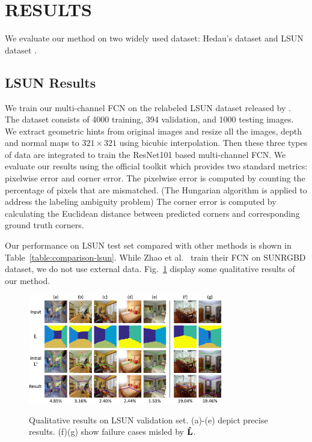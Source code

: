 \section{RESULTS}
\label{sec:Res}

We evaluate our method on two widely used dataset: Hedau's dataset \cite{hedau2009recovering} and LSUN dataset \cite{zhang2015large}. 
\subsection{LSUN Results}
\label{sec:LSUN}
We train our multi-channel FCN on the relabeled LSUN dataset released by \cite{ren2016coarse}. The dataset consists of 4000 training, 394 validation, and 1000 testing images. We extract geometric hints from original images and resize all the images, depth and normal maps to $321\times321$ using bicubic interpolation. Then these three types of data are integrated to train the ResNet101 based multi-channel FCN. We evaluate our results using the official toolkit which provides two standard metrics: pixelwise error and corner error. The pixelwise error is computed by counting the percentage of pixels that are mismatched. (The Hungarian algorithm is applied to address the labeling ambiguity problem) The corner error is computed by calculating the Euclidean distance between predicted corners and corresponding ground truth corners.

Our performance on LSUN test set compared with other methods is shown in Table~\ref{table:comparison-lsun}. While Zhao et al.~\cite{zhao2017physics} train their FCN on SUNRGBD dataset, we do not use external data. Fig.~\ref{fig:qualitative} display some qualitative results of our method. 

\begin{figure}[!ht]
	\centering
	\textsc{\includegraphics[width=8.5cm]{figure/qualitive.png}}
	\caption{Qualitative results on LSUN validation set. (a)-(e) depict precise results. (f)(g) show failure cases misled by $\mathbf{\hat{L}}$. }
	\label{fig:qualitative}
\end{figure}

